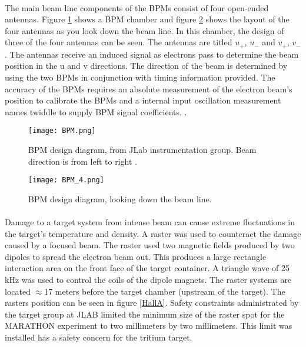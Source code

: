 	 \paragraph{} The main beam line components of the BPMs consist of four open-ended antennas. Figure \ref{BPMimg} shows a BPM chamber and figure \ref{BPM_4} shows the layout of the four antennas as you look down the beam line. In this chamber, the design of three of the four antennas can be seen. The antennas are titled $u_+$, $u_-$ and $v_+$, $v_-$. The antennas receive an induced signal as electrons pass to determine the beam position in the u and v directions. The direction of the beam is determined by using the two BPMs in conjunction with timing information provided. The accuracy of the BPMs requires an absolute measurement of the electron beam's position to calibrate the BPMs and a internal input oscillation measurement names twiddle to supply BPM signal coefficients.  \cite{BPM,BPM2}.
	 	 	\begin{figure}[H]
	 	 		\centering
	 	 		\caption{BPM design diagram, from JLab instrumentation	group. Beam direction is from left to right \cite{BPM2}. }
	 	 		\label{BPMimg}
	 	 		\texttt{[image: BPM.png]} 
	 	 	\end{figure} 	
	 
	 		\begin{figure}[H]
	 			\centering
	 			\caption{BPM design diagram, looking down the beam line\cite{BPM2}. }
	 			\label{BPM_4}
	 			\texttt{[image: BPM\_4.png]} 
	 		\end{figure} 

	
	 \paragraph{} Damage to a target system from intense beam can cause extreme fluctuations in the target's temperature and density. A raster was used to counteract the damage caused by a focused beam. The raster used two magnetic fields produced by two dipoles to spread the electron beam out. This produces a large rectangle interaction area on the front face of the target container. A triangle wave of 25 kHz was used to control the coils of the dipole magnets. The raster systems are located $\approx$17 meters before the target chamber (upstream of the target\cite{BPM2}). The rasters position can be seen in figure \ref{HallA}. Safety constraints administrated by the target group at JLAB limited the minimum size of the raster spot for the MARATHON experiment to two millimeters by two millimeters. This limit was installed has a safety concern for the tritium target. 
